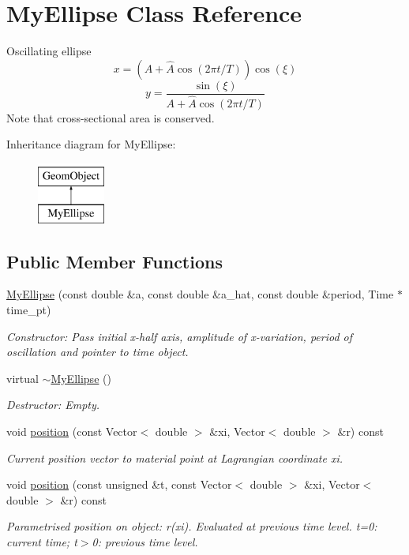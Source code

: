 \hypertarget{classMyEllipse}{}\section{My\+Ellipse Class Reference}
\label{classMyEllipse}


Oscillating ellipse \[ x = (A + \widehat{A} \cos(2\pi t/T)) \cos(\xi) \] \[ y = \frac{\sin(\xi)}{A + \widehat{A} \cos(2\pi t/T)} \] Note that cross-\/sectional area is conserved.  


Inheritance diagram for My\+Ellipse\+:\begin{figure}[H]
\begin{center}
\leavevmode
\includegraphics[height=2.000000cm]{classMyEllipse}
\end{center}
\end{figure}
\subsection*{Public Member Functions}
\begin{DoxyCompactItemize}
\item 
\hyperlink{classMyEllipse_a6d780f1f450d99e175842e88a3079069}{My\+Ellipse} (const double \&a, const double \&a\+\_\+hat, const double \&period, Time $\ast$time\+\_\+pt)
\begin{DoxyCompactList}\small\item\em Constructor\+: Pass initial x-\/half axis, amplitude of x-\/variation, period of oscillation and pointer to time object. \end{DoxyCompactList}\item 
virtual \hyperlink{classMyEllipse_ac2f2d3fb269c57fb26b4db6d9a0c7c05}{$\sim$\+My\+Ellipse} ()
\begin{DoxyCompactList}\small\item\em Destructor\+: Empty. \end{DoxyCompactList}\item 
void \hyperlink{classMyEllipse_a7b139a2f4564005773c83325f2414e3e}{position} (const Vector$<$ double $>$ \&xi, Vector$<$ double $>$ \&r) const
\begin{DoxyCompactList}\small\item\em Current position vector to material point at Lagrangian coordinate xi. \end{DoxyCompactList}\item 
void \hyperlink{classMyEllipse_a93f75bf33969037e35d779738a8493f5}{position} (const unsigned \&t, const Vector$<$ double $>$ \&xi, Vector$<$ double $>$ \&r) const
\begin{DoxyCompactList}\small\item\em Parametrised position on object\+: r(xi). Evaluated at previous time level. t=0\+: current time; t$>$0\+: previous time level. \end{DoxyCompactList}\end{DoxyCompactItemize}
